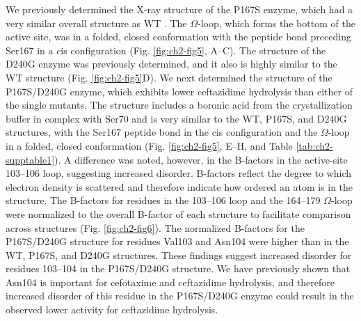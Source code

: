 \documentclass[../main.tex]{subfiles}
\begin{document}
        We previously determined the X-ray structure of the P167S enzyme, which had a very similar overall structure as WT \cite{patel_drug-resistant_2017}. The $\Omega$-loop, which forms the bottom of the active site, was in a folded, closed conformation with the peptide bond preceding Ser167 in a cis configuration (Fig. \ref{fig:ch2-fig5}, A–C). The structure of the D240G enzyme was previously determined, and it also is highly similar to the WT structure\cite{chen_atomic_2005} (Fig. \ref{fig:ch2-fig5}D). We next determined the structure of the P167S/D240G enzyme, which exhibits lower ceftazidime hydrolysis than either of the single mutants. The structure includes a boronic acid from the crystallization buffer in complex with Ser70 and is very similar to the WT, P167S, and D240G structures, with the Ser167 peptide bond in the cis configuration and the $\Omega$-loop in a folded, closed conformation (Fig. \ref{fig:ch2-fig5}, E–H, and Table \ref{tab:ch2-supptable1}). A difference was noted, however, in the B-factors in the active-site 103–106 loop, suggesting increased disorder. B-factors reflect the degree to which electron density is scattered and therefore indicate how ordered an atom is in the structure\cite{yuan_prediction_2005}. The B-factors for residues in the 103–106 loop and the 164–179 $\Omega$-loop were normalized to the overall B-factor of each structure to facilitate comparison across structures (Fig. \ref{fig:ch2-fig6}). The normalized B-factors for the P167S/D240G structure for residues Val103 and Asn104 were higher than in the WT, P167S, and D240G structures. These findings suggest increased disorder for residues 103–104 in the P167S/D240G structure. We have previously shown that Asn104 is important for cefotaxime and ceftazidime hydrolysis, and therefore increased disorder of this residue in the P167S/D240G enzyme could result in the observed lower activity for ceftazidime hydrolysis\cite{patel_synergistic_2018}.
\end{document}
